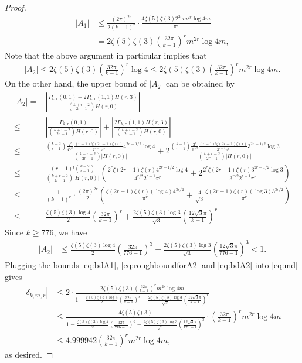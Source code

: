 \documentclass[10pt,a4paper]{amsart}
\begin{document}
\begin{proof}
\begin{align}
    |A_1|&\leq\frac{(2\pi)^{2r}}{2(k-1)^r}\cdot\frac{4\zeta(5)\zeta(3)2^{3r}m^{2r}\log4m}{\pi^r}\\&=2\zeta(5)\zeta(3)\left(\frac{32\pi}{k-1}\right)^rm^{2r}\log4m,\label{eq:bdA1}
\end{align}
Note that the above argument in particular implies that 
\begin{align}
    |A_{2}|\leq2\zeta(5)\zeta(3)\left(\frac{32\pi}{k-1}\right)^r\log4\leq2\zeta(5)\zeta(3)\left(\frac{32\pi}{k-1}\right)^rm^{2r}\log4m.\label{eq:roughboundforA2}
\end{align}
On the other hand, the upper bound of $|A_2|$ can be obtained by
\begin{align}
    |A_2|=&\left|\frac{P_{k,r}(0,1)+2P_{k,r}(1,1)H(r,3)}{\binom{k+r-2}{2r-1}H(r,0)}\right|\\\leq&\left|\frac{P_{k,r}(0,1)}{\binom{k+r-2}{2r-1}H(r,0)}\right|+\left|\frac{2P_{k,r}(1,1)H(r,3)}{\binom{k+r-2}{2r-1}H(r,0)}\right|\\\leq&\frac{\binom{k-2}{r-1}\frac{2^r}{4^{r/2}}\frac{(r-1)!\zeta(2r-1)\zeta(r)}{2^{r-1}\pi^r}4^{2r-1/2}\log4}{\binom{k+r-2}{2r-1}|H(r,0)|}+2\frac{\binom{k-2}{r-1}\frac{2^r}{3^{r/2}}\frac{(r-1)!\zeta(2r-1)\zeta(r)}{2^{r-1}\pi^r}3^{2r-1/2}\log3}{\binom{k+r-2}{2r-1}|H(r,0)|}\\\leq&\frac{(r-1)!\binom{k-2}{r-1}}{\binom{k+r-2}{2r-1}|H(r,0)|}\left(\frac{2^r\zeta(2r-1)\zeta(r)4^{2r-1/2}\log4}{4^{r/2}2^{r-1}\pi^r}+2\frac{2^r\zeta(2r-1)\zeta(r)3^{2r-1/2}\log3}{3^{r/2}2^{r-1}\pi^r}\right)\\\leq&\frac{1}{(k-1)^{r}}\cdot\frac{(2\pi)^{2r}}{2}\left(\frac{\zeta(2r-1)\zeta(r)(\log4)4^{3r/2}}{\pi^r}+\frac{4}{\sqrt{3}}\frac{\zeta(2r-1)\zeta(r)(\log3)3^{3r/2}}{\pi^r}\right)\\\leq&\frac{\zeta(5)\zeta(3)\log4}{2}\left(\frac{32\pi}{k-1}\right)^r+\frac{2\zeta(5)\zeta(3)\log3}{\sqrt{3}}\left(\frac{12\sqrt{3}\pi}{k-1}\right)^r\label{eq:bdA2}
\end{align}
Since $k\geq776$, we have
\begin{align}
|A_2|&\leq\frac{\zeta(5)\zeta(3)\log4}{2}\left(\frac{32\pi}{776-1}\right)^3+\frac{2\zeta(5)\zeta(3)\log3}{\sqrt{3}}\left(\frac{12\sqrt{3}\pi}{776-1}\right)^3<1.
\end{align}
Plugging the bounds \eqref{eq:bdA1}, \eqref{eq:roughboundforA2} and \eqref{eq:bdA2} into \eqref{eq:md} gives
\begin{align}
|\delta_{k,m,r}|&\leq2\cdot\frac{2\zeta(5)\zeta(3)\left(\frac{32\pi}{k-1}\right)^rm^{2r}\log4m}{1-\frac{\zeta(5)\zeta(3)\log4}{2}\left(\frac{32\pi}{k-1}\right)^r-\frac{2\zeta(5)\zeta(3)\log3}{\sqrt{3}}\left(\frac{12\sqrt{3}\pi}{k-1}\right)^r}\\&\leq \frac{4\zeta(5)\zeta(3)}{1-\frac{\zeta(5)\zeta(3)\log4}{2}\left(\frac{32\pi}{776-1}\right)^3-\frac{2\zeta(5)\zeta(3)\log3}{\sqrt{3}}\left(\frac{12\sqrt{3}\pi}{776-1}\right)^3}\cdot\left(\frac{32\pi}{k-1}\right)^rm^{2r}\log4m\\&\leq4.999942\left(\frac{32\pi}{k-1}\right)^rm^{2r}\log4m,
\end{align}
as desired.
\end{proof}
\end{document}
